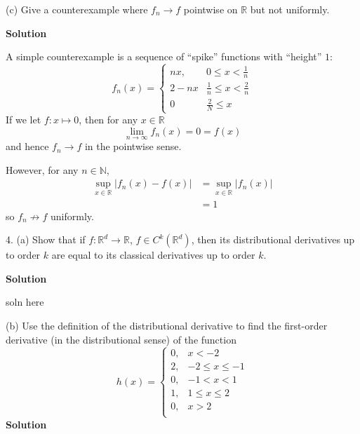 \documentclass{article}
\begin{document}
\vspace{5mm}

(c) Give a counterexample where $f_n \to f$ pointwise on
$\mathbb{R}$ but not uniformly.

\textbf{Solution}

A simple counterexample is a sequence of ``spike'' functions with
``height'' $1$:
%
\begin{equation*}
    f_n(x) =
        \begin{cases}
            n x, & 0 \leq x < \frac{1}{n} \\
            2 - n x & \frac{1}{n} \leq x < \frac{2}{n} \\
            0 & \frac{2}{N} \leq x
        \end{cases}
\end{equation*}
%
If we let $f: x \mapsto 0$, then for any $x \in \mathbb{R}$
%
\begin{equation*}
    \lim_{n \to \infty} f_n(x) = 0 = f(x)
\end{equation*}
%
and hence $f_n \to f$ in the pointwise sense.

However, for any $n \in \mathbb{N}$,
%
\begin{align*}
    \sup_{x \in \mathbb{R}} |f_n(x) - f(x)|
        &= \sup_{x \in \mathbb{R}} |f_n(x)| \\
        &= 1
\end{align*}
%
so $f_n \not\to f$ uniformly.

\newpage

4. (a) Show that if $f : \mathbb{R}^{d} \rightarrow \mathbb{R}$,
$f \in C^k(\mathbb{R}^d)$, then its distributional derivatives up to
order $k$ are equal to its classical derivatives up to order $k$.

\textbf{Solution}

soln here

\vspace{5mm}

(b) Use the definition of the distributional derivative to find the
first-order derivative (in the distributional sense) of the function
%
\begin{equation*}
    h(x) =
        \begin{cases}
            0, & x < -2 \\
            2, & -2 \leq x \leq -1 \\
            0, & -1 < x < 1 \\
            1, & 1 \leq x \leq 2 \\
            0, & x > 2 \\
        \end{cases}
\end{equation*}
%
\textbf{Solution}
\end{document}
